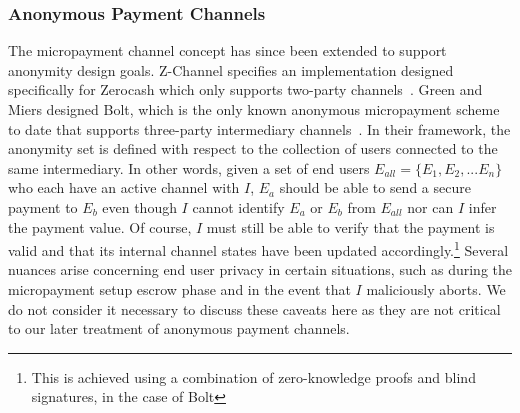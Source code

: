 \subsubsection{Anonymous Payment Channels} The micropayment channel concept has since
been extended to support anonymity design goals. Z-Channel specifies an
implementation designed specifically for Zerocash which only supports two-party
channels~\cite{zhang2017z}. Green and Miers designed Bolt, which is the only
known anonymous micropayment scheme to date that supports three-party
intermediary channels~\cite{green2017bolt}. In their framework, the anonymity
set is defined with respect to the collection of users connected to the same
intermediary. In other words, given a set of end users
$E_{all} = \{E_1, E_2, ... E_n\}$ who each have an active channel with $I$,
$E_a$ should be able to send a secure payment to $E_b$ even though $I$ cannot
identify $E_a$ or $E_b$ from $E_{all}$ nor can $I$ infer the payment value. Of
course, $I$ must still be able to verify that the payment is valid and that its
internal channel states have been updated accordingly.\footnote{This is achieved
  using a combination of zero-knowledge proofs and blind signatures, in the case
  of Bolt} Several nuances arise concerning end user privacy in certain
situations, such as during the micropayment setup escrow phase and in the event
that $I$ maliciously aborts. We do not consider it necessary to discuss these
caveats here as they are not critical to our later treatment of anonymous
payment channels.
